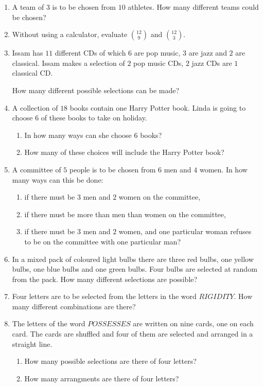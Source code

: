 \begin{enumerate}
	\item A team of $3$ is to be chosen from $10$ athletes. How many different teams could be chosen?
	
	\item  Without using a calculator, evaluate $\displaystyle \binom{12}{9}$ and $\displaystyle \binom{12}{3}$.
	
	
	\item  Issam has $11$ different CDs of which $6$ are pop music, $3$ are jazz and $2$ are classical. Issam makes a selection of $2$ pop music CDs, $2$ jazz CDs are $1$ classical CD.
	
	
	How many different possible selections can be made?
	
	
	\item A collection of $18$ books contain one Harry Potter book. Linda is going to choose $6$ of these books to take on holiday.
	
	\begin{enumerate}
		\item In how many ways can she choose $6$ books?
		\item How many of these choices will include the Harry Potter book?
	\end{enumerate}


\item  A committee of $5$ people is to be chosen from $6$ men and $4$ women. In how many ways can this be done:

\begin{enumerate}
	\item if there must be $3$ men and $2$  women on the committee,
	\item if there must be more than men than women on the committee,
	\item if there must be $3$ men and $2$ women, and one particular woman refuses to be on the committee with one particular man?
\end{enumerate}


\item In a mixed pack of coloured light bulbs there are three red bulbs, one yellow bulbs, one blue bulbs and one green bulbs. Four bulbs are selected at random from the pack. How many different selections are possible?
	
	
\item  Four letters are to be selected from the letters in the word $RIGIDITY$. How many different combinations are there?	


\item The letters of the word $POSSESSES$ are written on nine cards, one on each card. The cards are shuffled and four of them are selected and arranged in a straight line.
\begin{enumerate}
	\item How many possible selections are there of four letters?
	\item How many arrangments are there of four letters?
\end{enumerate}
\end{enumerate}	
	
